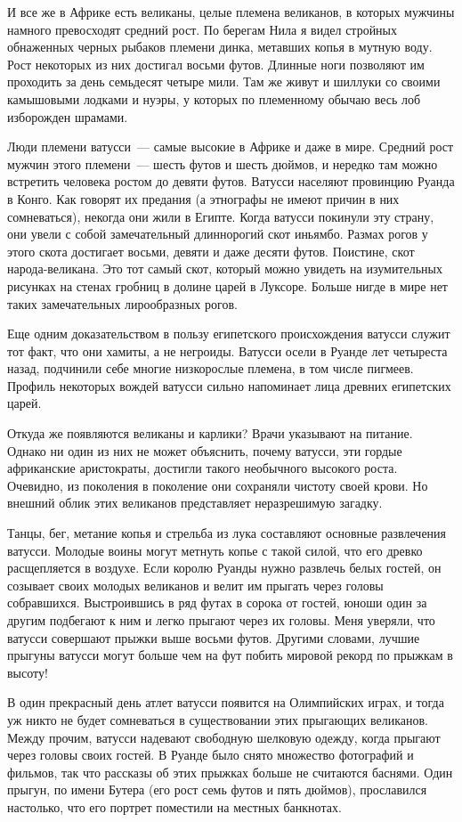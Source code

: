 \documentclass[12pt,a4paper,twoside,openany,svgnames]{memoir}
\begin{document}
И все же в Африке есть великаны, целые племена великанов, в которых мужчины намного превосходят средний рост. По берегам Нила я видел стройных обнаженных черных рыбаков племени динка, метавших копья в мутную воду. Рост некоторых из них достигал восьми футов. Длинные ноги позволяют им проходить за день семьдесят четыре мили. Там же живут и шиллуки со своими камышовыми лодками и нуэры, у которых по племенному обычаю весь лоб изборожден шрамами.

Люди племени ватусси~--- самые высокие в Африке и даже в мире. Средний рост мужчин этого племени~--- шесть футов и шесть дюймов, и нередко там можно встретить человека ростом до девяти футов. Ватусси населяют провинцию Руанда в Конго. Как говорят их предания (а этнографы не имеют причин в них сомневаться), некогда они жили в Египте. Когда ватусси покинули эту страну, они увели с собой замечательный длиннорогий скот иньямбо. Размах рогов у этого скота достигает восьми, девяти и даже десяти футов. Поистине, скот народа-великана. Это тот самый скот, который можно увидеть на изумительных рисунках на стенах гробниц в долине царей в Луксоре. Больше нигде в мире нет таких замечательных лирообразных рогов.

Еще одним доказательством в пользу египетского происхождения ватусси служит тот факт, что они хамиты, а не негроиды. Ватусси осели в Руанде лет четыреста назад, подчинили себе многие низкорослые племена, в том числе пигмеев. Профиль некоторых вождей ватусси сильно напоминает лица древних египетских царей.

Откуда же появляются великаны и карлики? Врачи указывают на питание. Однако ни один из них не может объяснить, почему ватусси, эти гордые африканские аристократы, достигли такого необычного высокого роста. Очевидно, из поколения в поколение они сохраняли чистоту своей крови. Но внешний облик этих великанов представляет неразрешимую загадку.

Танцы, бег, метание копья и стрельба из лука составляют основные развлечения ватусси. Молодые воины могут метнуть копье с такой силой, что его древко расщепляется в воздухе. Если королю Руанды нужно развлечь белых гостей, он созывает своих молодых великанов и велит им прыгать через головы собравшихся. Выстроившись в ряд футах в сорока от гостей, юноши один за другим подбегают к ним и легко прыгают через их головы. Меня уверяли, что ватусси совершают прыжки выше восьми футов. Другими словами, лучшие прыгуны ватусси могут больше чем на фут побить мировой рекорд по прыжкам в высоту!

В один прекрасный день атлет ватусси появится на Олимпийских играх, и тогда уж никто не будет сомневаться в существовании этих прыгающих великанов. Между прочим, ватусси надевают свободную шелковую одежду, когда прыгают через головы своих гостей. В Руанде было снято множество фотографий и фильмов, так что рассказы об этих прыжках больше не считаются баснями. Один прыгун, по имени Бутера (его рост семь футов и пять дюймов), прославился настолько, что его портрет поместили на местных банкнотах.
\end{document}
